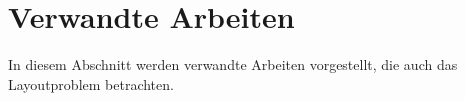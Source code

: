 \section{Verwandte Arbeiten} \label{sec:VerwandteArbeiten}
In diesem Abschnitt werden verwandte Arbeiten vorgestellt, die auch das Layoutproblem betrachten.

